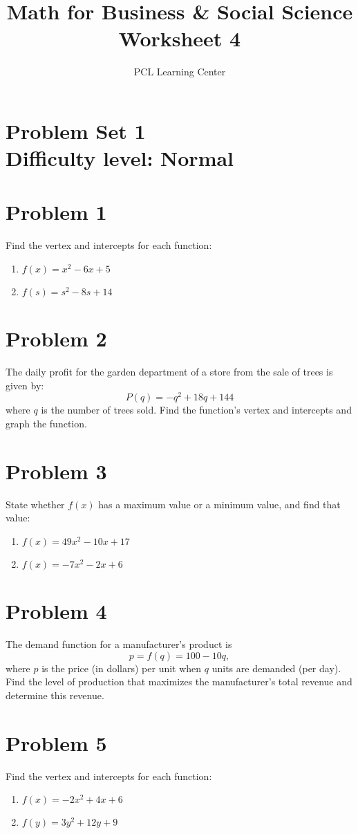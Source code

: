 \documentclass[12pt]{article}
\title{Math for Business \& Social Science\\ Worksheet 4}
\author{PCL Learning Center}
\date{}
\begin{document}
\maketitle

\section*{Problem Set 1\\Difficulty level: Normal}
\section*{Problem 1}
Find the vertex and intercepts for each function:
\begin{enumerate}[label=(\alph*)]
    \item \( f(x) = x^2 - 6x + 5 \)
    \item \( f(s) = s^2 - 8s + 14 \)
\end{enumerate}

\section*{Problem 2}
The daily profit for the garden department of a store from the sale of trees is given by:
\[
P(q) = -q^2 + 18q + 144
\]
where \( q \) is the number of trees sold. Find the function’s vertex and intercepts and graph the function.

\section*{Problem 3}
State whether \( f(x) \) has a maximum value or a minimum value, and find that value:
\begin{enumerate}[label=(\alph*)]
    \item \( f(x) = 49x^2 - 10x + 17 \)
    \item \( f(x) = -7x^2 - 2x + 6 \)
\end{enumerate}

\section*{Problem 4}
The demand function for a manufacturer’s product is 
\[
p = f(q) = 100 - 10q,
\]
where \( p \) is the price (in dollars) per unit when \( q \) units are demanded (per day). Find the level of production that maximizes the manufacturer’s total revenue and determine this revenue.

\section*{Problem 5}
Find the vertex and intercepts for each function:
\begin{enumerate}[label=(\alph*)]
    \item \( f(x) = -2x^2 + 4x + 6 \)
    \item \( f(y) = 3y^2 + 12y + 9 \)
\end{enumerate}
\end{document}
